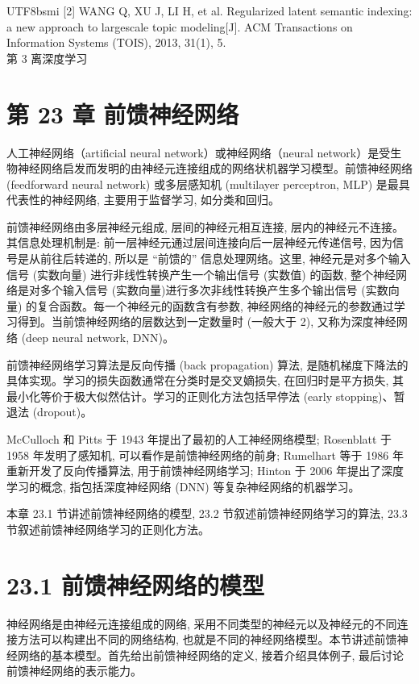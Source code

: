 \documentclass[10pt]{article}
\begin{document}
\begin{CJK*}{UTF8}{bsmi}
[2] WANG Q, XU J, LI H, et al. Regularized latent semantic indexing: a new approach to largescale topic modeling[J]. ACM Transactions on Information Systems (TOIS), 2013, 31(1), 5.\\
第 3 离深度学习

\section*{第 23 章 前馈神经网络}
人工神经网络（artificial neural network）或神经网络（neural network）是受生物神经网络启发而发明的由神经元连接组成的网络状机器学习模型。前馈神经网络 (feedforward neural network) 或多层感知机 (multilayer perceptron, MLP) 是最具代表性的神经网络, 主要用于监督学习, 如分类和回归。

前馈神经网络由多层神经元组成, 层间的神经元相互连接, 层内的神经元不连接。其信息处理机制是: 前一层神经元通过层间连接向后一层神经元传递信号, 因为信号是从前往后转递的, 所以是 “前馈的” 信息处理网络。这里, 神经元是对多个输入信号 (实数向量) 进行非线性转换产生一个输出信号 (实数值) 的函数, 整个神经网络是对多个输入信号 (实数向量)进行多次非线性转换产生多个输出信号 (实数向量) 的复合函数。每一个神经元的函数含有参数, 神经网络的神经元的参数通过学习得到。当前馈神经网络的层数达到一定数量时 (一般大于 2), 又称为深度神经网络 (deep neural network, DNN)。

前馈神经网络学习算法是反向传播 (back propagation) 算法, 是随机梯度下降法的具体实现。学习的损失函数通常在分类时是交叉嫡损失, 在回归时是平方损失, 其最小化等价于极大似然估计。学习的正则化方法包括早停法 (early stopping)、暂退法 (dropout)。

McCulloch 和 Pitts 于 1943 年提出了最初的人工神经网络模型; Rosenblatt 于 1958 年发明了感知机, 可以看作是前馈神经网络的前身; Rumelhart 等于 1986 年重新开发了反向传播算法, 用于前馈神经网络学习; Hinton 于 2006 年提出了深度学习的概念, 指包括深度神经网络 (DNN) 等复杂神经网络的机器学习。

本章 23.1 节讲述前馈神经网络的模型, 23.2 节叙述前馈神经网络学习的算法, 23.3 节叙述前馈神经网络学习的正则化方法。

\section*{23.1 前馈神经网络的模型}
神经网络是由神经元连接组成的网络, 采用不同类型的神经元以及神经元的不同连接方法可以构建出不同的网络结构, 也就是不同的神经网络模型。本节讲述前馈神经网络的基本模型。首先给出前馈神经网络的定义, 接着介绍具体例子, 最后讨论前馈神经网络的表示能力。


\end{CJK*}
\end{document}
